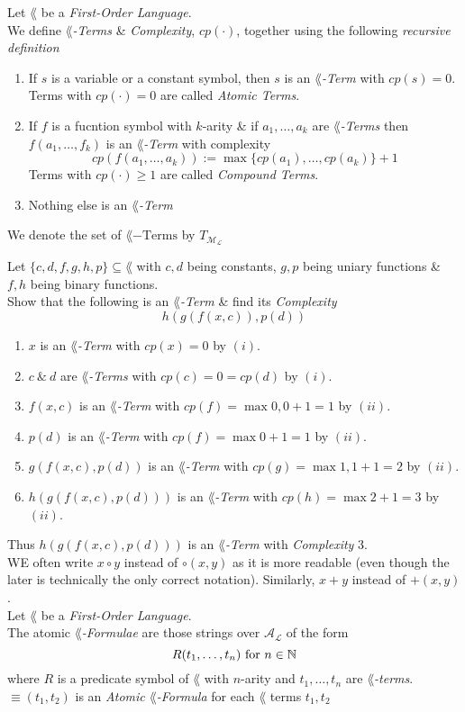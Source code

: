 \documentclass[11pt,a4paper]{article}
\begin{document}
Let $\lang$ be a \textit{First-Order Language}.\\
We define \textit{$\lang$-Terms} \& \textit{Complexity}, $cp(\cdot)$, together using the following \textit{recursive definition}
\begin{enumerate}
	\item If $s$ is a variable or a constant symbol, then $s$ is an \textit{$\lang$-Term} with $cp(s)=0$.\\
	\nb Terms with $cp(\cdot)=0$ are called \textit{Atomic Terms}.
	\item If $f$ is a fucntion symbol with $k$-arity \& if $a_1,\dots,a_k$ are \textit{$\lang$-Terms} then $f(a_1,\dots,f_k)$ is an \textit{$\lang$-Term} with complexity
	$$cp(f(a_1,\dots,a_k)):=\max\{cp(a_1),\dots,cp(a_k)\}+1$$
	\nb Terms with $cp(\cdot)\geq1$ are called \textit{Compound Terms}.
	\item Nothing else is an \textit{$\lang$-Term}
\end{enumerate}
\nb We denote the set of $\lang-\text{Terms}$ by $T_\mathcal{M_L}$

Let $\{c,d,f,g,h,p\}\subseteq\lang$ with $c,d$ being constants, $g,p$ being uniary functions \& $f,h$ being binary functions.\\
Show that the following is an $\lang$\textit{-Term} \& find its \textit{Complexity}
$$h(g(f(x,c)),p(d))$$
\begin{enumerate}
	\item $x$ is an $\lang$\textit{-Term} with $cp(x)=0$ by $(i)$.
	\item $c\ \&\ d$ are $\lang$\textit{-Terms} with $cp(c)=0=cp(d)$ by $(i)$.
	\item $f(x,c)$ is an $\lang$\textit{-Term} with $cp(f)=\max{0,0}+1=1$ by $(ii)$.
	\item $p(d)$ is an $\lang$\textit{-Term} with $cp(f)=\max{0}+1=1$ by $(ii)$.
	\item $g(f(x,c),p(d))$ is an $\lang$\textit{-Term} with $cp(g)=\max{1,1}+1=2$ by $(ii)$.
	\item $h(g(f(x,c),p(d)))$ is an $\lang$\textit{-Term} with $cp(h)=\max{2}+1=3$ by $(ii)$.
\end{enumerate}
Thus $h(g(f(x,c),p(d)))$ is an $\lang$\textit{-Term} with \textit{Complexity} 3.\\

WE often write $x\circ y$ instead of $\circ(x,y)$ as it is more readable (even though the later is technically the only correct notation). Similarly, $x+y$ instead of $+(x,y)$.\\

Let $\lang$ be a \textit{First-Order Language}.\\
The atomic $\lang$\textit{-Formulae} are those strings over $\mathcal{A_L}$ of the form
$$R(t_1,\dots,t_n)\text{ for }n\in\mathbb{N}$$
where $R$ is a predicate symbol of $\lang$ with $n$-arity and $t_1,\dots,t_n$ are $\lang$\textit{-terms}.\\
\nb $\equiv(t_1,t_2)$ is an \textit{Atomic $\lang$-Formula} for each $\lang$ terms $t_1,t_2$
\end{document}
